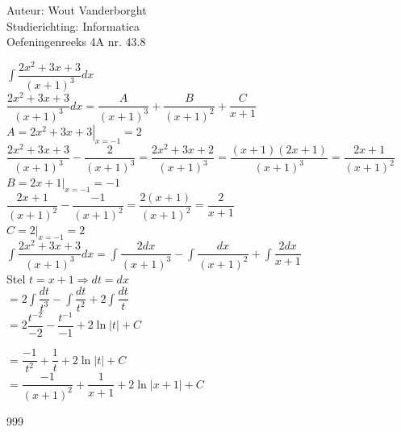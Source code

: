 \documentclass[a4paper]{article}
\newcommand{\Int}{\displaystyle\int}
\begin{document}
  
\noindent \large Auteur: Wout Vanderborght\\
\noindent \large Studierichting: Informatica\\
\noindent \large Oefeningenreeks 4A nr. 43.8\\

\medskip

\normalsize

$ \Int \dfrac{2x^2+3x+3}{(x+1)^3}dx $ \\

$ \dfrac{2x^2+3x+3}{(x+1)^3}dx = \dfrac{A}{(x+1)^3} + \dfrac{B}{(x+1)^2} + \dfrac{C}{x+1} $ \\

$ A = \left. 2x^2+3x+3 \right|_{x = -1} = 2 $ \\

$ \dfrac{2x^2+3x+3}{(x+1)^3} - \dfrac{2}{(x+1)^3} = \dfrac{2x^2+3x+2}{(x+1)^3} = \dfrac{(x+1)(2x+1)}{(x+1)^3} = \dfrac{2x+1}{(x+1)^2} $ \\

$ B = \left. 2x+1 \right|_{x = -1} = -1 $ \\

$ \dfrac{2x+1}{(x+1)^2} - \dfrac{-1}{(x+1)^2} = \dfrac{2(x+1)}{(x+1)^2} = \dfrac{2}{x+1} $ \\

$ C = \left. 2 \right|_{x = -1} = 2 $ \\

$ \Int \dfrac{2x^2+3x+3}{(x+1)^3}dx = \Int \dfrac{2dx}{(x+1)^3} - \Int \dfrac{dx}{(x+1)^2} + \Int \dfrac{2dx}{x+1} $ \\

Stel $t = x+1 \Rightarrow dt = dx $\\

$ = 2\Int \dfrac{dt}{t^3} - \Int \dfrac{dt}{t^2} + 2\Int \dfrac{dt}{t} $ \\

$ = 2\dfrac{t^{-2}}{-2} - \dfrac{t^{-1}}{-1} + 2\ln|t| + C $

$ = \dfrac{-1}{t^2} + \dfrac{1}{t} + 2\ln|t| + C $ \\

$ = \dfrac{-1}{(x+1)^2} + \dfrac{1}{x+1} + 2\ln|x+1| + C $ \\

\begin{thebibliography}{999}
\end{thebibliography}
\end{document}
